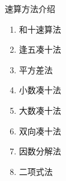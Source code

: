 \documentclass[aspectratio=169]{ctexbeamer} %
\date{\today}
\begin{document}
\begin{frame}[t]{速算方法介绍}
\begin{spacing}{1.2}
\normalsize
\begin{enumerate}[label={\arabic*.}]
\item 和十速算法
\item 逢五凑十法
\item 平方差法
\item 小数凑十法
\item 大数凑十法
\item 双向凑十法
\item 因数分解法
\item 二项式法

\end{enumerate}

\end{spacing}
\end{frame}
\end{document}

